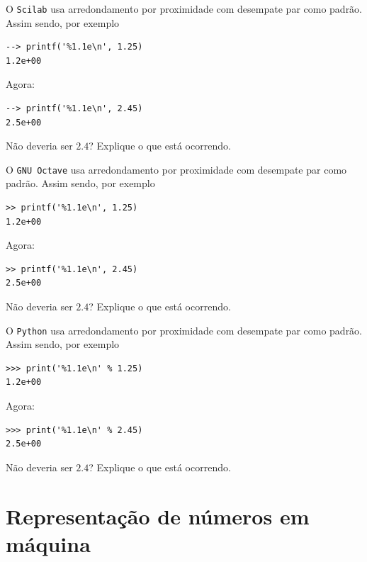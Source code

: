 \ifisscilab
\begin{exer}
  O \verb+Scilab+ usa arredondamento por proximidade com desempate par
  como padrão. Assim sendo, por exemplo
\begin{verbatim}
--> printf('%1.1e\n', 1.25) 
1.2e+00
\end{verbatim}
  Agora:
\begin{verbatim}
--> printf('%1.1e\n', 2.45)
2.5e+00
\end{verbatim}
  Não deveria ser $2.4$? Explique o que está ocorrendo.
\end{exer}
\begin{resp}
  \construirResp
\end{resp}
\fi
\ifisoctave
\begin{exer}
  O \verb+GNU Octave+ usa arredondamento por proximidade com desempate
  par como padrão. Assim sendo, por exemplo
\begin{verbatim}
>> printf('%1.1e\n', 1.25)
1.2e+00
\end{verbatim}
  Agora:
\begin{verbatim}
>> printf('%1.1e\n', 2.45)
2.5e+00
\end{verbatim}
  Não deveria ser $2.4$? Explique o que está ocorrendo.
\end{exer}
\begin{resp}
  \construirResp
\end{resp}
\fi
\ifisoctave
\begin{exer}
  O \verb+Python+ usa arredondamento por proximidade com desempate par
  como padrão. Assim sendo, por exemplo
\begin{verbatim}
>>> print('%1.1e\n' % 1.25)
1.2e+00
\end{verbatim}
  Agora:
\begin{verbatim}
>>> print('%1.1e\n' % 2.45)
2.5e+00
\end{verbatim}
  Não deveria ser $2.4$? Explique o que está ocorrendo.
\end{exer}
\begin{resp}
  \construirResp
\end{resp}
\fi


\section{Representação de números em máquina}

